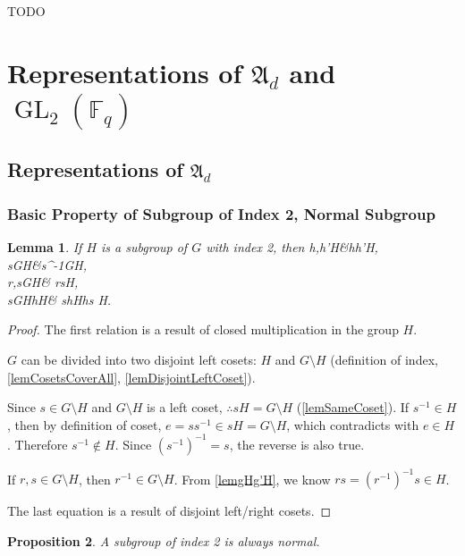 \documentclass[12pt, letterpaper]{article}
\newcommand{\GL}{\operatorname{GL}}
\newcommand{\red}[1]{{\color{red} #1}}
\newenvironment{eqlong}{\equation\aligned}{\endaligned\endequation}
\newtheorem{prop}{Proposition}[section]
\newtheorem{lem}[prop]{Lemma}
\theoremstyle{definition}
\theoremstyle{remark}
\theoremstyle{definition}
\theoremstyle{plain}
\numberwithin{equation}{section}
\begin{document}
	\red{TODO}
	
	\section{Representations of $\mathfrak{A}_d$ and $\GL_2(\mathbb{F}_q)$}
	\subsection{Representations of $\mathfrak{A}_d$}
	
	\subsubsection{Basic Property of Subgroup of Index 2, Normal Subgroup}
	\begin{lem}\label{lemHalfGroupEvenOdd}
		If $H$ is a subgroup of $G$ with index 2, then 
		\begin{eqlong}
			h,h'\in H\implies&hh'\in H,\\
			s\in G\setminus H\iff &s^{-1}\in G\setminus H,\\
			r,s\in G\setminus H\implies& rs\in H,\\
			s\in G\setminus H\land h\in H\implies& sh\notin H\land hs \notin H.\\
		\end{eqlong}
	\end{lem}
	\begin{proof}
		The first relation is a result of closed multiplication in the group $H$.
		
		$G$ can be divided into two disjoint left cosets: $H$ and $G\setminus H$ (definition of index,
		\ref{lemCosetsCoverAll}, \ref{lemDisjointLeftCoset}).
		
		Since $s\in G\setminus H$ and $G\setminus H$ is a left coset,
		$\therefore sH=G\setminus H$ (\ref{lemSameCoset}).
		If $s^{-1}\in H$, then by definition of coset, $e=ss^{-1}\in sH=G\setminus H$,
		which contradicts with $e\in H$.
		Therefore $s^{-1}\notin H$.
		Since $(s^{-1})^{-1}=s$, the reverse is also true.
		
		If $r,s\in G\setminus H$, then $r^{-1}\in G\setminus H$.
		From \ref{lemgHg'H}, we know $rs=(r^{-1})^{-1}s\in H$.
		
		The last equation is a result of disjoint left/right cosets.
	\end{proof}
	\begin{prop}\label{lemHalfGroupNormal}
		A subgroup of index 2 is always normal.
	\end{prop}
\end{document}
